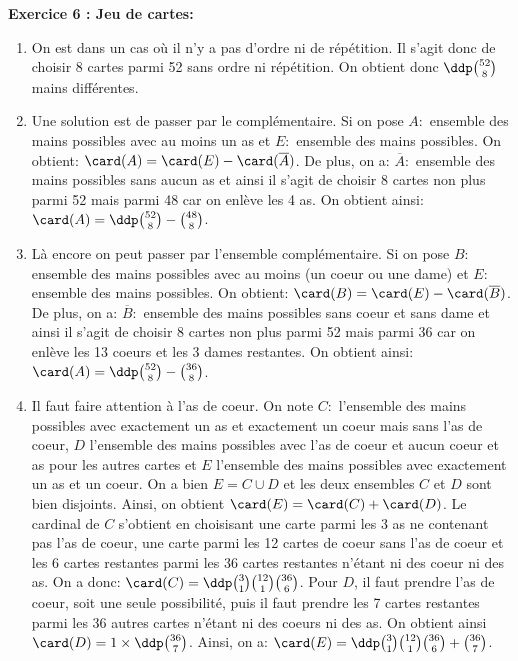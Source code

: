 \documentclass[a4paper, 11pt,reqno]{article}
\begin{document}
\begin{correction}  \; \textbf{Exercice 6 : Jeu de cartes:}
\begin{enumerate}
 \item On est dans un cas o\`u il n'y a pas d'ordre ni de r\'ep\'etition. Il s'agit donc de choisir 8 cartes parmi 52 sans ordre ni r\'ep\'etition. 
On obtient donc $\ddp \binom{52}{8}$ mains diff\'erentes.
\item Une solution est de passer par le compl\'ementaire. Si on pose $A:$ ensemble des mains possibles avec au moins un as et $E:$ ensemble des mains possibles. On obtient: $\card (A)=\card (E)-\card (\overline{A})$. De plus, on a: $\overline{A}:$ ensemble des mains possibles sans aucun as et ainsi il s'agit de choisir 8 cartes non plus parmi 52 mais parmi 48 car on enl\`eve les 4 as. On obtient ainsi: $\card (A)=\ddp \binom{52}{8}-\binom{48}{8}$. 
\item L\`a encore on peut passer par l'ensemble compl\'ementaire. Si on pose $B:$ ensemble des mains possibles avec au moins (un coeur ou une dame) et $E:$ ensemble des mains possibles. On obtient: $\card (B)=\card (E)-\card (\overline{B})$. De plus, on a: $\overline{B}:$ ensemble des mains possibles sans coeur et sans dame et ainsi il s'agit de choisir 8 cartes non plus parmi 52 mais parmi 36 car on enl\`eve les 13 coeurs et les 3 dames restantes. On obtient ainsi: $\card (A)=\ddp \binom{52}{8}-\binom{36}{8}$. 
\item Il faut faire attention \`a l'as de coeur. On note $C:$ l'ensemble des mains possibles avec exactement un as et exactement un coeur mais sans l'as de coeur, $D$ l'ensemble des mains possibles avec l'as de coeur et aucun coeur et as pour les autres cartes et $E$ l'ensemble des mains possibles avec exactement un as et un coeur. On a bien $E=C\cup D$ et les deux ensembles $C$ et $D$ sont bien disjoints. Ainsi, on obtient $\card (E)=\card (C)+\card (D)$. Le cardinal de $C$ s'obtient en choisisant une carte parmi les 3 as ne contenant pas l'as de coeur, une carte parmi les 12 cartes de coeur sans l'as de coeur et les 6 cartes restantes parmi les 36 cartes restantes n'\'etant ni des coeur ni des as. On a donc: $\card (C)=\ddp \binom{3}{1}\binom{12}{1}\binom{36}{6}$. Pour $D$, il faut prendre l'as de coeur, soit une seule possibilit\'e, puis il faut prendre les 7 cartes restantes parmi les $36$ autres cartes n'\'etant ni des coeurs ni des as. On obtient ainsi $\card (D)=1\times \ddp \binom{36}{7}$. Ainsi, on a: 
$\card (E)=\ddp\binom{3}{1}\binom{12}{1}\binom{36}{6} + \binom{36}{7}$.

\end{enumerate}
\end{correction}
\end{document}
